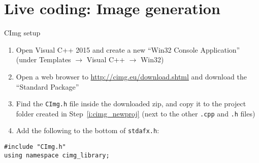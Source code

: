 \part{Live coding: Image generation}
\frame{\partpage}

\begin{frame}[fragile]{CImg setup}
    \begin{enumerate}
        \item \label{i:cimg_newproj} Open Visual C++ 2015 and create a new ``Win32 Console Application'' (under Templates $\to$ Visual C++ $\to$ Win32)
        \item Open a web browser to \url{http://cimg.eu/download.shtml} and download the ``Standard Package''
        \item Find the \texttt{CImg.h} file inside the downloaded zip, and copy it to the project folder created in Step~\ref{i:cimg_newproj} (next to the other \texttt{.cpp} and \texttt{.h} files)
        \item Add the following to the bottom of \texttt{stdafx.h}:
    \end{enumerate}
    \begin{lstlisting}
#include "CImg.h"
using namespace cimg_library;
    \end{lstlisting}
\end{frame}
